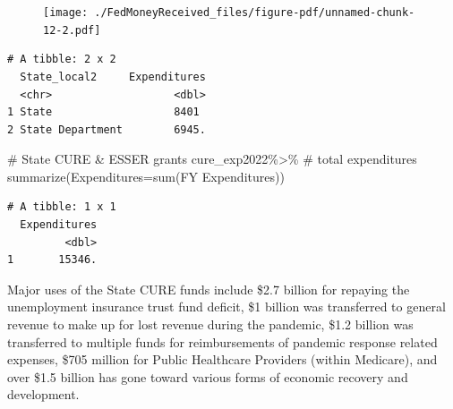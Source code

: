 \documentclass[
  letterpaper,
  DIV=11,
  numbers=noendperiod]{scrreport}
\newenvironment{Shaded}{\begin{snugshade}}{\end{snugshade}}
\newcommand{\AttributeTok}[1]{\textcolor[rgb]{0.40,0.45,0.13}{#1}}
\newcommand{\CommentTok}[1]{\textcolor[rgb]{0.37,0.37,0.37}{#1}}
\newcommand{\FunctionTok}[1]{\textcolor[rgb]{0.28,0.35,0.67}{#1}}
\newcommand{\NormalTok}[1]{\textcolor[rgb]{0.00,0.23,0.31}{#1}}
\newcommand{\SpecialCharTok}[1]{\textcolor[rgb]{0.37,0.37,0.37}{#1}}
\newcommand{\StringTok}[1]{\textcolor[rgb]{0.13,0.47,0.30}{#1}}
\begin{document}
\begin{figure}[H]

{\centering \texttt{[image: ./FedMoneyReceived\_files/figure-pdf/unnamed-chunk-12-2.pdf]}

}

\end{figure}

\begin{Shaded}
\end{Shaded}

\begin{verbatim}
# A tibble: 2 x 2
  State_local2     Expenditures
  <chr>                   <dbl>
1 State                   8401 
2 State Department        6945.
\end{verbatim}

\begin{Shaded}
\begin{Highlighting}[]
\CommentTok{\# State CURE \& ESSER grants}
\NormalTok{cure\_exp2022}\SpecialCharTok{\%\textgreater{}\%} \CommentTok{\# total expenditures }
  \FunctionTok{summarize}\NormalTok{(}\AttributeTok{Expenditures=}\FunctionTok{sum}\NormalTok{(}\StringTok{\textasciigrave{}}\AttributeTok{FY Expenditures}\StringTok{\textasciigrave{}}\NormalTok{)) }
\end{Highlighting}
\end{Shaded}

\begin{verbatim}
# A tibble: 1 x 1
  Expenditures
         <dbl>
1       15346.
\end{verbatim}

Major uses of the State CURE funds include \$2.7 billion for repaying
the unemployment insurance trust fund deficit, \$1 billion was
transferred to general revenue to make up for lost revenue during the
pandemic, \$1.2 billion was transferred to multiple funds for
reimbursements of pandemic response related expenses, \$705 million for
Public Healthcare Providers (within Medicare), and over \$1.5 billion
has gone toward various forms of economic recovery and development.
\end{document}
